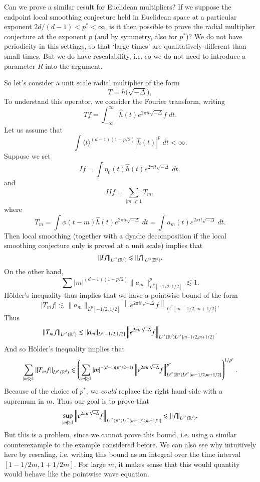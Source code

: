 Can we prove a similar result for Euclidean multipliers? If we suppose the endpoint local smoothing conjecture held in Euclidean space at a particular exponent $2d/(d-1) < p^* < \infty$, is it then possible to prove the radial multiplier conjecture at the exponent $p$ (and by symmetry, also for $p^*$)? We do not have periodicity in this settings, so that `large times' are qualitatively different than small times. But we do have rescalability, i.e. so we do not need to introduce a parameter $R$ into the argument.

So let's consider a unit scale radial multiplier of the form
%
\[ T = h \Big( \sqrt{-\Delta} \Big), \]
%
To understand this operator, we consider the Fourier transform, writing
%
\[ Tf = \int_{-\infty}^\infty \widehat{h}(t) e^{2 \pi i t \sqrt{-\Delta}} f\; dt. \]
%
Let us assume that
%
\[ \int \langle t \rangle^{(d-1)(1 - p/2)} |\widehat{h}(t)|^p \; dt < \infty. \]
%
Suppose we set
%
\[ I f = \int \eta_0(t) \widehat{h}(t) e^{2 \pi i t \sqrt{-\Delta}}\; dt, \]
%
and
%
\[ II f = \sum_{|m| \gtrsim 1} T_m, \]
%
where
%
\[ T_m = \int \phi(t - m) \widehat{h}(t) e^{2 \pi i t \sqrt{-\Delta}}\; dt = \int a_m(t) e^{2 \pi i t \sqrt{-\Delta}}\; dt. \]
%
Then local smoothing (together with a dyadic decomposition if the local smoothing conjecture only is proved at a unit scale) implies that
%
\[ \| I f \|_{L^{p^*}(\operatorname{\mathbb{R}}^d)} \lesssim \| f \|_{L^{p*}(\operatorname{\mathbb{R}}^d)}. \]
%
On the other hand,
%
\[ \sum |m|^{(d-1)(1 - p/2)} \| a_m \|_{L^p[-1/2,1/2]}^p \lesssim 1. \]
%
H\"{o}lder's inequality thus implies that we have a pointwise bound of the form
%
\[ |T_m f| \lesssim \| a_m \|_{L^p[-1/2,1/2]} \left\| e^{2 \pi i t \sqrt{-\Delta}} f \right\|_{L^{p^*}[m-1/2,m+1/2]}. \]
%
Thus
%
\[ \| T_m f \|_{L^{p^*}(\operatorname{\mathbb{R}}^d)} \lesssim \| a_m \|_{L^p[-1/2,1/2]} \left\| e^{2 \pi i t \sqrt{-\Delta}} f \right\|_{L^{p^*}(\operatorname{\mathbb{R}}^d) L^{p^*}[m-1/2,m+1/2]}. \]
%
And so H\"{o}lder's inequality implies that
%
\[ \sum_{|m| \gtrsim 1} \| T_m f \|_{L^{p^*}(\operatorname{\mathbb{R}}^d)} \lesssim \left( \sum_{|m| \gtrsim 1} |m|^{-(d-1)(p^*/2 - 1)} \left\| e^{2 \pi i t \sqrt{-\Delta}} f \right\|_{L^{p^*}(\operatorname{\mathbb{R}}^d) L^{p^*}[m-1/2,m+1/2]}^{p^*} \right)^{1/p^*}. \]
%
Because of the choice of $p^*$, we \emph{could} replace the right hand side with a supremum in $m$. Thus our goal is to prove that
%
\[ \sup_{|m| \gtrsim 1} \left\| e^{2 \pi i t \sqrt{-\Delta}} f \right\|_{L^{p^*}(\operatorname{\mathbb{R}}^d) L^{p^*}[m-1/2,m+1/2]} \lesssim \| f \|_{L^{p^*}(\operatorname{\mathbb{R}}^d)}. \]
%
But this is a problem, since we cannot prove this bound, i.e. using a similar counterexample to the example considered before. We can also see why intuitively here by rescaling, i.e. writing this bound as an integral over the time interval $[ 1 - 1/2m, 1 + 1/2m ]$. For large $m$, it makes sense that this would quantity would behave like the pointwise wave equation.


